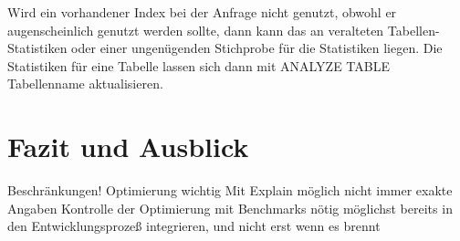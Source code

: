 Wird ein vorhandener Index bei der Anfrage nicht genutzt, obwohl er augenscheinlich genutzt werden sollte, dann kann das an veralteten Tabellen-Statistiken oder einer ungenügenden Stichprobe für die Statistiken liegen. Die Statistiken für eine Tabelle lassen sich dann mit ANALYZE TABLE Tabellenname aktualisieren.

\section{Fazit und Ausblick}

Beschränkungen!
Optimierung wichtig
Mit Explain möglich
nicht immer exakte Angaben
Kontrolle der Optimierung mit Benchmarks nötig
möglichst bereits in den Entwicklungsprozeß integrieren, und nicht erst wenn es brennt

